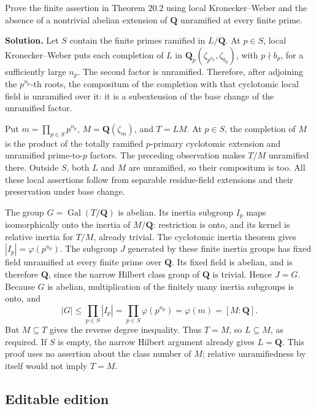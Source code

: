 \documentclass[11pt,a4paper]{article}
\begin{document}
Prove the finite assertion in Theorem 20.2 using local Kronecker--Weber
and the absence of a nontrivial abelian extension of \(\mathbf Q\)
unramified at every finite prime.

\textbf{Solution.} Let \(S\) contain the finite primes ramified in
\(L/\mathbf Q\). At \(p\in S\), local Kronecker--Weber puts each
completion of \(L\) in \(\mathbf Q_p(\zeta_{p^{n_p}},\zeta_{b_p})\),
with \(p\nmid b_p\), for a sufficiently large \(n_p\). The second factor
is unramified. Therefore, after adjoining the \(p^{n_p}\)-th roots, the
compositum of the completion with that cyclotomic local field is
unramified over it: it is a subextension of the base change of the
unramified factor.

Put \(m=\prod_{p\in S}p^{n_p}\), \(M=\mathbf Q(\zeta_m)\), and \(T=LM\).
At \(p\in S\), the completion of \(M\) is the product of the totally
ramified \(p\)-primary cyclotomic extension and unramified
prime-to-\(p\) factors. The preceding observation makes \(T/M\)
unramified there. Outside \(S\), both \(L\) and \(M\) are unramified, so
their compositum is too. All these local assertions follow from
separable residue-field extensions and their preservation under base
change.

The group \(G=\operatorname{Gal}(T/\mathbf Q)\) is abelian. Its inertia
subgroup \(I_p\) maps isomorphically onto the inertia of
\(M/\mathbf Q\): restriction is onto, and its kernel is relative inertia
for \(T/M\), already trivial. The cyclotomic inertia theorem gives
\(|I_p|=\varphi(p^{n_p})\). The subgroup \(J\) generated by these finite
inertia groups has fixed field unramified at every finite prime over
\(\mathbf Q\). Its fixed field is abelian, and is therefore
\(\mathbf Q\), since the narrow Hilbert class group of \(\mathbf Q\) is
trivial. Hence \(J=G\). Because \(G\) is abelian, multiplication of the
finitely many inertia subgroups is onto, and \[
|G|\leq\prod_{p\in S}|I_p|=\prod_{p\in S}\varphi(p^{n_p})
=\varphi(m)=[M:\mathbf Q].
\] But \(M\subseteq T\) gives the reverse degree inequality. Thus
\(T=M\), so \(L\subseteq M\), as required. If \(S\) is empty, the narrow
Hilbert argument already gives \(L=\mathbf Q\). This proof uses no
assertion about the class number of \(M\); relative unramifiedness by
itself would not imply \(T=M\).

\subsection{Editable edition}\label{editable-edition}
\end{document}
